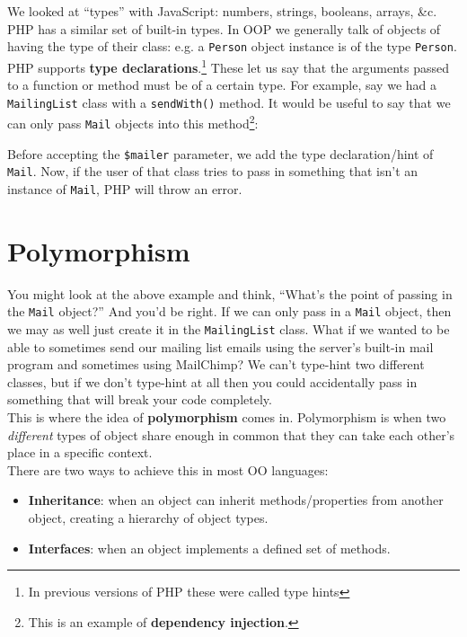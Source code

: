 We looked at ``types'' with JavaScript: numbers, strings, booleans, arrays, \&c. PHP has a similar set of built-in types. In OOP we generally talk of objects of having the type of their class: e.g. a \texttt{Person} object instance is of the type \texttt{Person}.
\\

PHP supports \textbf{type declarations}.\footnote{In previous versions of PHP these were called type hints} These let us say that the arguments passed to a function or method must be of a certain type. For example, say we had a \texttt{MailingList} class with a \texttt{sendWith()} method. It would be useful to say that we can only pass \texttt{Mail} objects into this method\footnote{This is an example of \textbf{dependency injection}.}:


Before accepting the \texttt{\$mailer} parameter, we add the type declaration/hint of \texttt{Mail}. Now, if the user of that class tries to pass in something that isn't an instance of \texttt{Mail}, PHP will throw an error.



\section{Polymorphism}

You might look at the above example and think, ``What's the point of passing in the \texttt{Mail} object?'' And you'd be right. If we can only pass in a \texttt{Mail} object, then we may as well just create it in the \texttt{MailingList} class. What if we wanted to be able to sometimes send our mailing list emails using the server's built-in mail program and sometimes using MailChimp? We can't type-hint two different classes, but if we don't type-hint at all then you could accidentally pass in something that will break your code completely.
\\

This is where the idea of \textbf{polymorphism} comes in. Polymorphism is when two \textit{different} types of object share enough in common that they can take each other's place in a specific context.
\\

There are two ways to achieve this in most OO languages:

\begin{itemize}
    \item \textbf{Inheritance}: when an object can inherit methods/properties from another object, creating a hierarchy of object types.
    \item \textbf{Interfaces}: when an object implements a defined set of methods.
\end{itemize}


